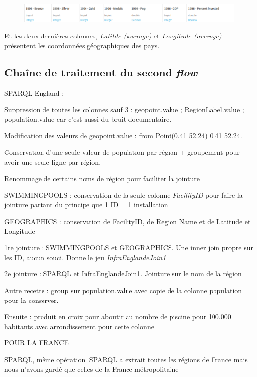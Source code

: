 \documentclass[hidelinks, 12pt]{article}
\begin{document}
\begin{center}
	\begin{figure}[H]
		\includegraphics[scale=0.4]{images/tableaufinal.png}
	\end{figure}
\end{center}


Et les deux dernières colonnes, \emph{Latitde (average)} et \emph{Longitude (average)} présentent les coordonnées géographiques des pays.


\subsection{Chaîne de traitement du second \emph{flow}}

SPARQL England :

Suppression de toutes les colonnes sauf 3 : geopoint.value ; RegionLabel.value ; population.value car c'est aussi du bruit documentaire.

Modification des valeurs de geopoint.value : from Point(0.41 52.24) 0.41 52.24.

Conservation d'une seule valeur de population par région + groupement pour avoir une seule ligne par région.

Renommage de certains noms de région pour faciliter la jointure


SWIMMINGPOOLS : conservation de la seule colonne \emph{FacilityID} pour faire la jointure partant du principe que 1 ID = 1 installation

GEOGRAPHICS : conservation de FacilityID, de Region Name et de Latitude et Longitude

1re jointure : SWIMMINGPOOLS et GEOGRAPHICS. Une inner join propre sur les ID, aucun souci. Donne le jeu \emph{InfraEnglandeJoin1}

2e jointure : SPARQL et InfraEnglandeJoin1. Jointure sur le nom de la région

Autre recette : group sur population.value avec copie de la colonne population pour la conserver.

Ensuite : produit en croix pour aboutir au nombre de piscine pour 100.000 habitants avec arrondissement pour cette colonne





POUR LA FRANCE

SPARQL, même opération. SPARQL a extrait toutes les régions de France mais nous n'avons gardé que celles de la France métropolitaine 
\end{document}
